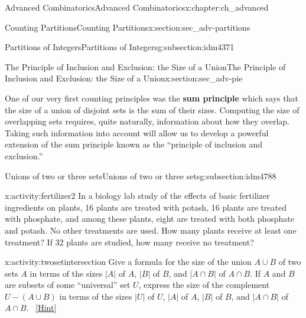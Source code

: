 \documentclass[oneside,10pt,]{book}
\newcommand{\terminology}[1]{\textbf{#1}}
\numberwithin{equation}{chapter}
\begin{document}
\begin{chapterptx}{Advanced Combinatorics}{}{Advanced Combinatorics}{}{}{x:chapter:ch_advanced}
\begin{sectionptx}{Counting Partitions}{}{Counting Partitions}{}{}{x:section:sec_adv-partitions}
\begin{subsectionptx}{Partitions of Integers}{}{Partitions of Integers}{}{}{g:subsection:idm4371}
\end{subsectionptx}
\end{sectionptx}
%
%
\typeout{************************************************}
\typeout{************************************************}
%
\begin{sectionptx}{The Principle of Inclusion and Exclusion: the Size of a Union}{}{The Principle of Inclusion and Exclusion: the Size of a Union}{}{}{x:section:sec_adv-pie}
\begin{introduction}{}%
One of our very first counting principles was the \terminology{sum principle} which says that the size of a union of disjoint sets is the sum of their sizes. Computing the size of overlapping sets requires, quite naturally, information about how they overlap. Taking such information into account will allow us to develop a powerful extension of the sum principle known as the ``principle of inclusion and exclusion.''%
\end{introduction}%
%
%
\typeout{************************************************}
\typeout{************************************************}
%
\begin{subsectionptx}{Unions of two or three sets}{}{Unions of two or three sets}{}{}{g:subsection:idm4788}
\begin{activity}{}{x:activity:fertilizer2}%
In a biology lab study of the effects of basic fertilizer ingredients on plants, 16 plants are treated with potash, 16 plants are treated with phosphate, and among these plants, eight are treated with both phosphate and potash. No other treatments are used. How many plants receive at least one treatment? If 32 plants are studied, how many receive no treatment?%
\end{activity}
\begin{activity}{}{x:activity:twosetintersection}%
Give a formula for the size of the union \(A\cup B\) of two sets \(A\) in terms of the sizes \(|A|\) of \(A\), \(|B|\) of \(B\), and \(|A\cap B|\) of \(A\cap B\). If \(A\) and \(B\) are subsets of some ``universal'' set \(U\), express the size of the complement \(U-(A\cup B)\) in terms of the sizes \(|U|\) of \(U\), \(|A|\) of \(A\), \(|B|\) of \(B\), and \(|A\cap B|\) of \(A\cap B\).%
\qquad~\hfill{\tiny\hyperlink{g:hint:idm4820-back}{[Hint]}}\end{activity}

\end{subsectionptx}
\end{sectionptx}
\end{chapterptx}
\end{document}
